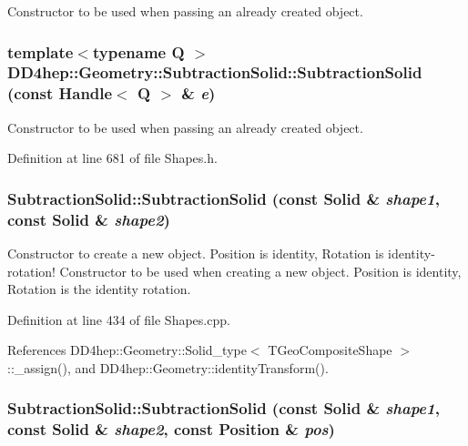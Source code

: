 Constructor to be used when passing an already created object. \hypertarget{class_d_d4hep_1_1_geometry_1_1_subtraction_solid_a72e018b273167f9ecd373c369ce1067e}{
\subsubsection[{SubtractionSolid}]{\setlength{\rightskip}{0pt plus 5cm}template$<$typename Q $>$ DD4hep::Geometry::SubtractionSolid::SubtractionSolid (const {\bf Handle}$<$ Q $>$ \& {\em e})}}
\label{class_d_d4hep_1_1_geometry_1_1_subtraction_solid_a72e018b273167f9ecd373c369ce1067e}


Constructor to be used when passing an already created object. 

Definition at line 681 of file Shapes.h.\hypertarget{class_d_d4hep_1_1_geometry_1_1_subtraction_solid_a41ea60f70c3ad3d119510470610936ec}{
\subsubsection[{SubtractionSolid}]{\setlength{\rightskip}{0pt plus 5cm}SubtractionSolid::SubtractionSolid (const {\bf Solid} \& {\em shape1}, \/  const {\bf Solid} \& {\em shape2})}}
\label{class_d_d4hep_1_1_geometry_1_1_subtraction_solid_a41ea60f70c3ad3d119510470610936ec}


Constructor to create a new object. Position is identity, Rotation is identity-\/rotation! Constructor to be used when creating a new object. Position is identity, Rotation is the identity rotation. 

Definition at line 434 of file Shapes.cpp.

References DD4hep::Geometry::Solid\_\-type$<$ TGeoCompositeShape $>$::\_\-assign(), and DD4hep::Geometry::identityTransform().\hypertarget{class_d_d4hep_1_1_geometry_1_1_subtraction_solid_a7db81162af38bc569247d94d06d7b3fd}{
\subsubsection[{SubtractionSolid}]{\setlength{\rightskip}{0pt plus 5cm}SubtractionSolid::SubtractionSolid (const {\bf Solid} \& {\em shape1}, \/  const {\bf Solid} \& {\em shape2}, \/  const {\bf Position} \& {\em pos})}}
\label{class_d_d4hep_1_1_geometry_1_1_subtraction_solid_a7db81162af38bc569247d94d06d7b3fd}


